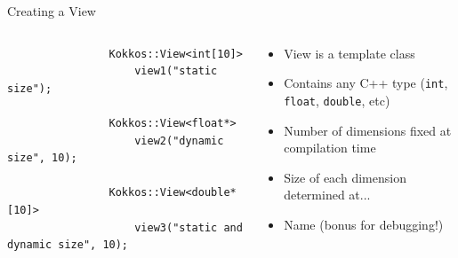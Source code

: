 \documentclass[
    aspectratio=169,
]{beamer}
\begin{document}
\begin{frame}[fragile]{Creating a View}
    \begin{columns}
        \begin{column}{0.6\linewidth}
            \begin{verbatim}
                Kokkos::View<int[10]>
                    view1("static size");

                Kokkos::View<float*>
                    view2("dynamic size", 10);

                Kokkos::View<double*[10]>
                    view3("static and dynamic size", 10);
            \end{verbatim}
        \end{column}
        \begin{column}{0.4\linewidth}
            \begin{itemize}
                \item View is a template class
                \item Contains any C++ type (\texttt{int}, \texttt{float}, \texttt{double}, etc)
                \item Number of dimensions fixed at compilation time
                \item Size of each dimension determined at...
                \item Name (bonus for debugging!)
            \end{itemize}
        \end{column}
    \end{columns}
\end{frame}

\end{document}
